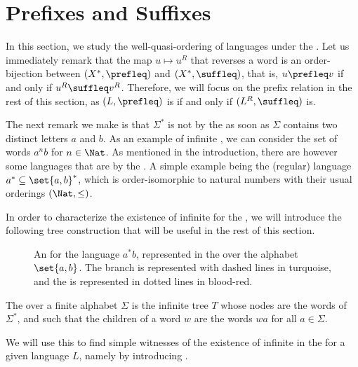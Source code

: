 \section{Prefixes and Suffixes}
\label{prefixes:sec}

In this section, we study the well-quasi-ordering of languages under the
. Let us immediately remark that the map $u \mapsto u^R$
that reverses a word is an order-bijection between $(X^*, \prefleq)$ and $(X^*,
\suffleq)$, that is, $u \prefleq v$ if and only if $u^R \suffleq v^R$.
Therefore, we will focus on the prefix relation in the rest of this section, as
$(L, \prefleq)$ is  if and only if $(L^R, \suffleq)$ is.

The next remark we make is that $\Sigma^*$ is not  by
the  as soon as $\Sigma$ contains two distinct letters $a$
and $b$. As an example of infinite , we can consider the set of
words $a^n b$ for $n \in \Nat$. As mentioned in the introduction, there are
however some languages  that are  by the . A simple example being the (regular) language $a^* \subseteq
\set{a,b}^*$, which is order-isomorphic to natural numbers with their usual
orderings $(\Nat, \leq)$.

In order to characterize the existence of infinite  for the
, we will introduce the following tree construction that
will be useful in the rest of this section.

\begin{figure}
    \centering
    
    \caption{An  for the language $a^* b$,
        represented in the  over the alphabet $\set{a,b}$.
        The branch is represented with dashed lines in turquoise, and the
         is represented in dotted lines in blood-red.
    }
    \label{antichain-branch:fig}
\end{figure}

\begin{definition}
    The  over a finite alphabet $\Sigma$
    is the infinite tree $T$ whose nodes are the words of $\Sigma^*$, and
    such that the children of a word $w$ are the words $wa$ for all $a \in
    \Sigma$. 
\end{definition}

We will use this  to find simple witnesses
of the existence of infinite  in the 
for a given language $L$, namely by introducing .

